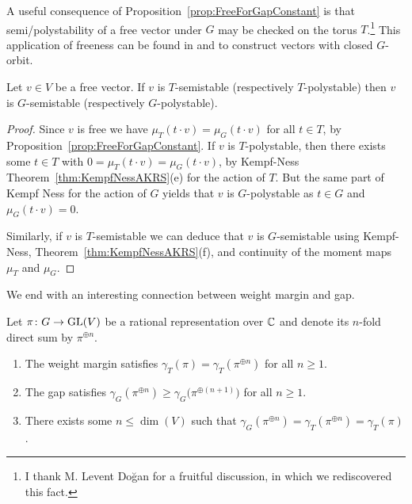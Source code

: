 A useful consequence of Proposition~\ref{prop:FreeForGapConstant} is that semi/polystability of a free vector under $G$ may be checked on the torus $T$.\footnote{I thank M. Levent Doğan for a fruitful discussion, in which we rediscovered this fact.}
This application of freeness can be found in \cite[Proposition~1.2]{dadok1985polar} and \cite[Theorem~6.5]{derksen2020exponential} to construct vectors with closed $G$-orbit.

\begin{cor} \label{cor:FreeVector}
	Let $v \in V$ be a free vector. If $v$ is $T$-semistable (respectively $T$-polystable) then $v$ is $G$-semistable (respectively $G$-polystable).
\end{cor}

\begin{proof}
	Since $v$ is free we have $\mu_{T}(t \cdot v) = \mu_{G} (t \cdot v)$ for all $t \in T$, by Proposition~\ref{prop:FreeForGapConstant}. If $v$ is $T$-polystable, then there exists some $t \in T$ with $0 = \mu_{T}(t \cdot v) = \mu_{G} (t \cdot v)$, by Kempf-Ness Theorem~\ref{thm:KempfNessAKRS}(e) for the action of $T$. But the same part of Kempf Ness for the action of $G$ yields that $v$ is $G$-polystable as $t \in G$ and $\mu_{G} (t \cdot v) = 0$.
	
	Similarly, if $v$ is $T$-semistable we can deduce that $v$ is $G$-semistable using Kempf-Ness, Theorem~\ref{thm:KempfNessAKRS}(f), and continuity of the moment maps $\mu_T$ and $\mu_G$.
\end{proof}

We end with an interesting connection between weight margin and gap.


\begin{prop}  \label{prop:WeightGapForDirectPower}
	Let $\pi \colon G \to \operatorname{GL}(V)$ be a rational representation over $\mathbb C$ and denote its $n$-fold direct sum by $\pi^{\oplus n}$.
	\begin{enumerate}
		\item The weight margin satisfies $\gamma_{T}(\pi) = \gamma_{T}(\pi^{\oplus n})$ for all $n \geq 1$.
		
		\item The gap satisfies $\gamma_{G}(\pi^{\oplus n}) \geq \gamma_{G} \big( \pi^{\oplus(n+1)} \big)$ for all $n \geq 1$.
		
		\item There exists some $n \leq \dim(V)$ such that $\gamma_{G}(\pi^{\oplus n}) = \gamma_{T}(\pi^{\oplus n}) = \gamma_{T}(\pi)$.
	\end{enumerate}	 
\end{prop}

